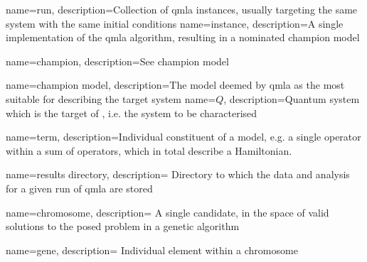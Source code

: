 {
    name=run,
    description={Collection of \gls{qmla} \glspl{instance}, usually targeting the same system with the same initial conditions}
}
{
    name=instance,
    description={A single implementation of the \gls{qmla} algorithm, resulting in a nominated \gls{champion model}}
}

{
    name=champion,
    description={See \gls{champion model}}
}

{
    name=champion model,
    description={The model deemed by \gls{qmla} as the most suitable for describing the target system}
}
{
    name=$Q$,
    description={Quantum system which is the target of , i.e. the system to be characterised}
}

{
    name=term,
    description={Individual constituent of a model, 
    e.g. a single operator within a sum of operators, which in total describe a Hamiltonian.
    }
}

{
    name={results directory},
    description={
        Directory to which the data and analysis for a given \gls{run} of \gls{qmla} are stored
    }
}

{
    name=chromosome,
    description={
        A single candidate, in the space of valid solutions to the posed problem in a genetic algorithm
    }
}

{
    name=gene,
    description={
        Individual element within a \gls{chromosome}
    }
}


\makeglossaries
